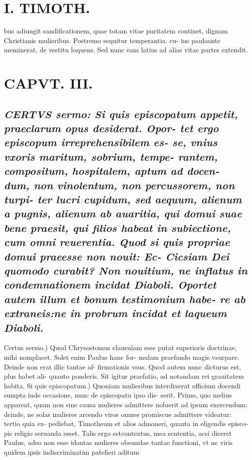 \documentclass{article}
\begin{document}
\begin{pages}
\section*{I. TIMOTH. }
\marginpar{[ p.30 ]}\pstart bus adiungit sandificationem, quae totam vitae puritatem continet, dignam Christianis mulieribus. Postremo sequitur temperantia, cu- ius pauloante meminerat, de vestitu loquens. Sed nunc eam latius ad alias vitae partes extendit.  \pend
\endnumbering\beginnumbering\section{CAPVT. III.}
{}
\subsection*{\textit{\huge\textbf{C}\normalsize ERTVS sermo: Si quis episcopatum appetit, praeclarum opus desiderat. Opor- tet ergo episcopum irreprehensibilem es- se, vnius vxoris maritum, sobrium, tempe- rantem, compositum, hospitalem, aptum ad docen- dum, non vinolentum, non percussorem, non turpi- ter lucri cupidum, sed aequum, alienum a pugnis, alienum ab auaritia, qui domui suae bene praesit, qui filios habeat in subiectione, cum omni reuerentia. Quod si quis propriae domui praeesse non nouit: Ec- Cicsiam Dei quomodo curabit? Non nouitium, ne inflatus in condemnationem incidat Diaboli. Oportet autem illum et bonum testimonium habe- re ab extraneis:ne in probrum incidat et laqueum Diaboli. }}\pstart Certus sermo.) Quod Chrysostomus clausulam esse putat superioris doctrinae, mihi nomplacet. Solet enim Paulus hanc for- mulam praefando magis vsurpare. Deinde non erat illic tantae af- firmationis vsus. Quod autem nunc dicturus est, plus habet ali- quanto ponderis. Sit igitur praefatio, ad notandam rei grauitatem  \pend\pstart habita. Si quis episcopatum.) Quoniam mulieribus interdixerat officium docendi sumpta inde occasione, nunc de episcopatu ipso dis- serit. Primo, quo melius appareat, quam non sine causa mulieres admittere noluerit ad ipsum exercendum: deinde, ne solas mulieres arcendo viros omnes promiscue admittere videatur: tertio quia ex- pediebat, Timotheum et alios admoneri, quanta in eligendis episco- pis religio seruanda esset. Talis ergo estcontextus, mea sententia, acsi diceret Paulus, adeo non esse idontas mulieres obeundae tantae functioni, vt ne viris quidem ipsis indiscriminatim patefieri aditum  \pend
\endnumbering
\end{pages}
\end{document}
